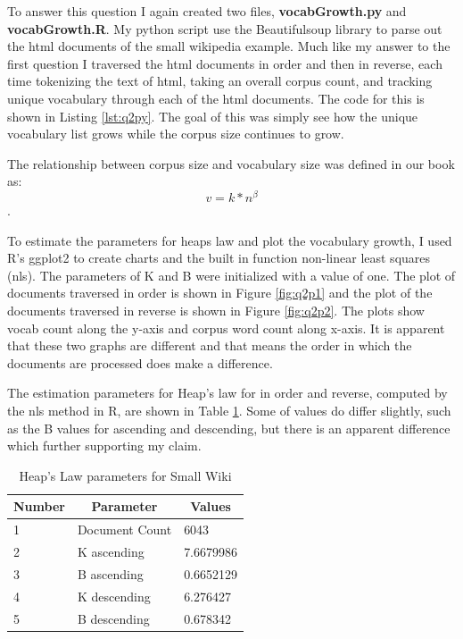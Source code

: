 \documentclass[letterpaper,11pt]{article}
\newcommand*{\srcPath}{../src}%
\begin{document}
To answer this question I again created two files, \textbf{vocabGrowth.py} and \textbf{vocabGrowth.R}.
My python script use the Beautifulsoup library to parse out the html documents of the small wikipedia example.
Much like my answer to the first question I traversed the html documents in order and then in reverse, each time tokenizing the text of html, taking an overall corpus count, and tracking unique vocabulary through each of the html documents. 
The code for this is shown in Listing \ref{lst:q2py}.
The goal of this was simply see how the unique vocabulary list grows while the corpus size continues to grow.

  

The relationship between corpus size and vocabulary size was defined in our book as: \[ v = k * n^\beta \].

To estimate the parameters for heaps law and plot the vocabulary growth, I used R's ggplot2 to create charts and the built in function non-linear least squares (nls).
The parameters of K and B were initialized with a value of one. 
The plot of documents traversed in order is shown in Figure \ref{fig:q2p1} and the plot of the documents traversed in reverse is shown in Figure \ref{fig:q2p2}.
The plots show vocab count along the y-axis and corpus word count along x-axis.
It is apparent that these two graphs are different and that means the order in which the documents are processed does make a difference.

The estimation parameters for Heap's law for in order and reverse, computed by the nls method in R, are shown in Table \ref{table:heap}. 
Some of values do differ slightly, such as the B values for ascending and descending, but there is an apparent difference which further supporting my claim.

\begin{table}
\centering
\begin{tabular}{|l|l|l|}
\hline
\multicolumn{1}{|c|}{\textbf{Number}} & \multicolumn{1}{c|}{\textbf{Parameter}} & \multicolumn{1}{c|}{\textbf{Values}} \\ \hline
1 & Document Count & 6043 \\ \hline
2 & K ascending & 7.6679986 \\ \hline
3 & B ascending & 0.6652129 \\ \hline
4 & K descending & 6.276427 \\ \hline
5 & B descending & 0.678342 \\ \hline
\end{tabular}
\caption{Heap's Law parameters for Small Wiki}
\label{table:heap}
\end{table}
\end{document}
